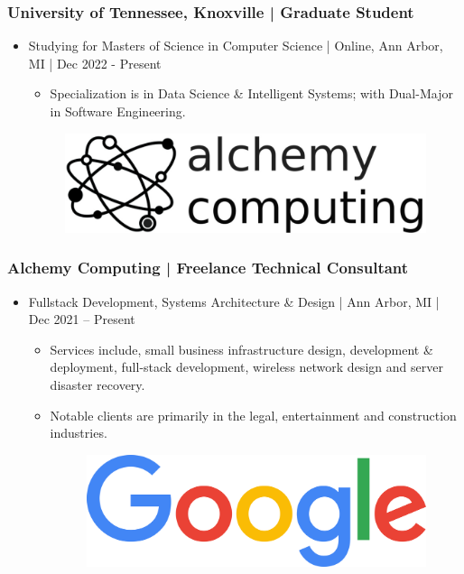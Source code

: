 \documentclass[letter,10pt]{article}
\begin{document}
\subsubsection*{University of Tennessee, Knoxville | Graduate Student}
\label{sec:org7470ad4}
\begin{itemize}
\item Studying for Masters of Science in Computer Science | Online, Ann Arbor, MI | Dec 2022 - Present
\label{sec:org77e6bcc}
\begin{itemize}
\item Specialization is in Data Science \& Intelligent Systems; with Dual-Major in Software Engineering.
\end{itemize}


\begin{figure}
\includegraphics[width=0.8\linewidth]{./img/50p_alchemy_computing.jpg}
\end{figure}
\end{itemize}

\subsubsection*{Alchemy Computing | Freelance Technical Consultant}
\label{sec:orgfa2ca93}
\begin{itemize}
\item Fullstack Development, Systems Architecture \& Design | Ann Arbor, MI | Dec 2021 – Present
\label{sec:orge70f236}
\begin{itemize}
\item Services include, small business infrastructure design, development \& deployment, full-stack development, wireless network design and server disaster recovery.
\label{sec:org07ba525}
\item Notable clients are primarily in the legal, entertainment and construction industries.
\label{sec:org69e0095}



\begin{figure}
\includegraphics[width=0.85\linewidth]{./img/cr_google.jpg}
\end{figure}
\end{itemize}
\end{itemize}
\end{document}
